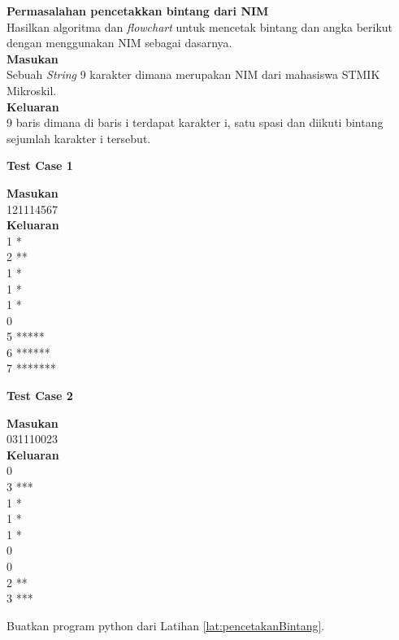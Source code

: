 \begin{konsep}
\label{lat:pencetakanBintang}
\textbf{Permasalahan pencetakkan bintang dari NIM}\\
Hasilkan algoritma dan \textit{flowchart} untuk mencetak bintang dan angka berikut dengan menggunakan NIM sebagai dasarnya.\\
\textbf{Masukan}\\
Sebuah \textit{String} 9 karakter dimana merupakan NIM dari mahasiswa STMIK Mikroskil.\\
\textbf{Keluaran}\\
9 baris dimana di baris i terdapat karakter i, satu spasi dan diikuti bintang sejumlah karakter i tersebut.\\
\begin{center}
\textbf{Test Case 1}\\
\end{center}
\textbf{Masukan}\\
121114567\\
\textbf{Keluaran}\\
1 * \\
2 ** \\
1 * \\
1 * \\
1 * \\
0 \\
5 ***** \\
6 ****** \\
7 ******* \\
\begin{center}
\textbf{Test Case 2}\\
\end{center}
\textbf{Masukan}\\
031110023\\
\textbf{Keluaran}\\
0  \\
3 *** \\
1 * \\
1 * \\
1 * \\
0 \\
0 \\
2 ** \\
3 *** \\
\end{konsep}

\begin{pemrograman}
Buatkan program python dari Latihan \ref{lat:pencetakanBintang}.
\end{pemrograman}
